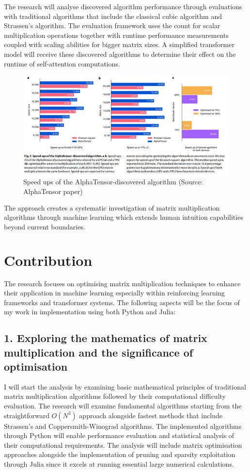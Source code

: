 \documentclass{article}
\begin{document}
The research will analyse discovered algorithm performance through evaluations with traditional algorithms that include the classical cubic algorithm and Strassen's algorithm. The evaluation framework uses the count for scalar multiplication operations together with runtime performance measurements coupled with scaling abilities for bigger matrix sizes. A simplified transformer model will receive these discovered algorithms to determine their effect on the runtime of self-attention computations.

\begin{figure}[H]
    \centering
    \includegraphics[width=0.6\linewidth]{Picture3.png}
    \caption{Speed ups of the AlphaTensor-discovered algorithm (Source: AlphaTensor paper)}
    \label{fig:speedups-alphatensor}
\end{figure}

The approach creates a systematic investigation of matrix multiplication algorithms through machine learning which extends human intuition capabilities beyond current boundaries.

\section{Contribution}
The research focuses on optimising matrix multiplication techniques to enhance their application in machine learning especially within reinforcing learning frameworks and transformer systems. The following aspects will be the focus of my work in implementation using both Python and Julia:

\subsection*{1. Exploring the mathematics of matrix multiplication and the significance of optimisation}
I will start the analysis by examining basic mathematical principles of traditional matrix multiplication algorithms followed by their computational difficulty evaluation. The research will examine fundamental algorithms starting from the straightforward \( O(N^3) \) approach alongside fastest methods that include Strassen's and Coppersmith-Winograd algorithms. The implemented algorithms through Python will enable performance evaluation and statistical analysis of their computational requirements. The analysis will include matrix optimisation approaches alongside the implementation of pruning and sparsity exploitation through Julia since it excels at running essential large numerical calculations.
\end{document}
